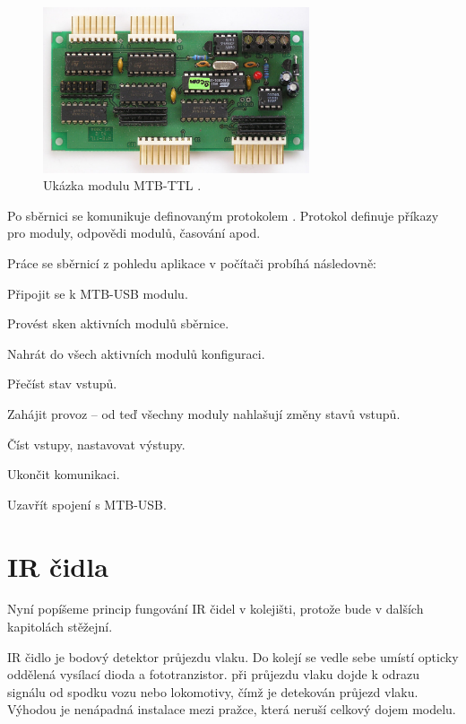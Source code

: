 \begin{figure}[ht]
\includegraphics[width=0.7\textwidth]{data/mtbttl_foto.jpg}
\caption{Ukázka modulu MTB-TTL \cite{mtb:web}.}
\label{fig:mtbttl}
\end{figure}

Po sběrnici se komunikuje definovaným protokolem \cite{mtbbus-proto}. Protokol
definuje příkazy pro moduly, odpovědi modulů, časování apod.

Práce se sběrnicí z pohledu aplikace v počítači probíhá následovně:

\begin{compactenum}
\item Připojit se k MTB-USB modulu.
\item Provést sken aktivních modulů sběrnice.
\item Nahrát do všech aktivních modulů konfiguraci.
\item Přečíst stav vstupů.
\item Zahájit provoz – od teď všechny moduly nahlašují změny stavů vstupů.
\item Číst vstupy, nastavovat výstupy.
\item Ukončit komunikaci.
\item Uzavřít spojení s MTB-USB.
\end{compactenum}

\section{IR čidla} \label{sec:uni_ir}

Nyní popíšeme princip fungování IR čidel v kolejišti, protože bude v dalších
kapitolách stěžejní.

IR čidlo je bodový detektor průjezdu vlaku. Do kolejí se vedle sebe umístí
opticky oddělená vysílací dioda a fototranzistor. při průjezdu vlaku dojde k
odrazu signálu od spodku vozu nebo lokomotivy, čímž je detekován průjezd vlaku.
Výhodou je nenápadná instalace mezi pražce, která neruší celkový dojem modelu.

